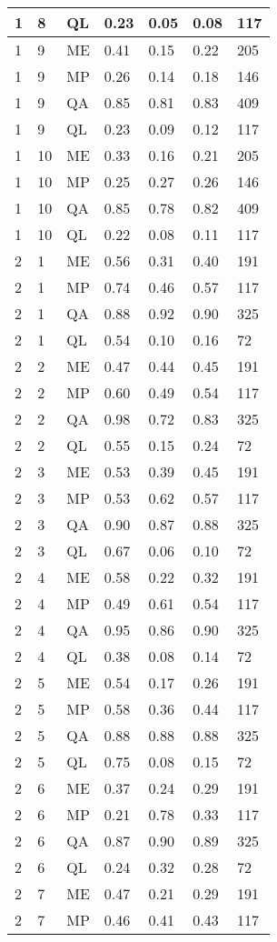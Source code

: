 \begin{table}[!ht]
\begin{tabularx}{300pt}{|X|X|X|X|X|X|X|}
\hline
1&8&QL&0.23&0.05&0.08&117\\
\hline
1&9&ME&0.41&0.15&0.22&205\\
\hline
1&9&MP&0.26&0.14&0.18&146\\
\hline
1&9&QA&0.85&0.81&0.83&409\\
\hline
1&9&QL&0.23&0.09&0.12&117\\
\hline
1&10&ME&0.33&0.16&0.21&205\\
\hline
1&10&MP&0.25&0.27&0.26&146\\
\hline
1&10&QA&0.85&0.78&0.82&409\\
\hline
1&10&QL&0.22&0.08&0.11&117\\
\hline
2&1&ME&0.56&0.31&0.40&191\\
\hline
2&1&MP&0.74&0.46&0.57&117\\
\hline
2&1&QA&0.88&0.92&0.90&325\\
\hline
2&1&QL&0.54&0.10&0.16&72\\
\hline
2&2&ME&0.47&0.44&0.45&191\\
\hline
2&2&MP&0.60&0.49&0.54&117\\
\hline
2&2&QA&0.98&0.72&0.83&325\\
\hline
2&2&QL&0.55&0.15&0.24&72\\
\hline
2&3&ME&0.53&0.39&0.45&191\\
\hline
2&3&MP&0.53&0.62&0.57&117\\
\hline
2&3&QA&0.90&0.87&0.88&325\\
\hline
2&3&QL&0.67&0.06&0.10&72\\
\hline
2&4&ME&0.58&0.22&0.32&191\\
\hline
2&4&MP&0.49&0.61&0.54&117\\
\hline
2&4&QA&0.95&0.86&0.90&325\\
\hline
2&4&QL&0.38&0.08&0.14&72\\
\hline
2&5&ME&0.54&0.17&0.26&191\\
\hline
2&5&MP&0.58&0.36&0.44&117\\
\hline
2&5&QA&0.88&0.88&0.88&325\\
\hline
2&5&QL&0.75&0.08&0.15&72\\
\hline
2&6&ME&0.37&0.24&0.29&191\\
\hline
2&6&MP&0.21&0.78&0.33&117\\
\hline
2&6&QA&0.87&0.90&0.89&325\\
\hline
2&6&QL&0.24&0.32&0.28&72\\
\hline
2&7&ME&0.47&0.21&0.29&191\\
\hline
2&7&MP&0.46&0.41&0.43&117\\

\end{tabularx}
\end{table}
